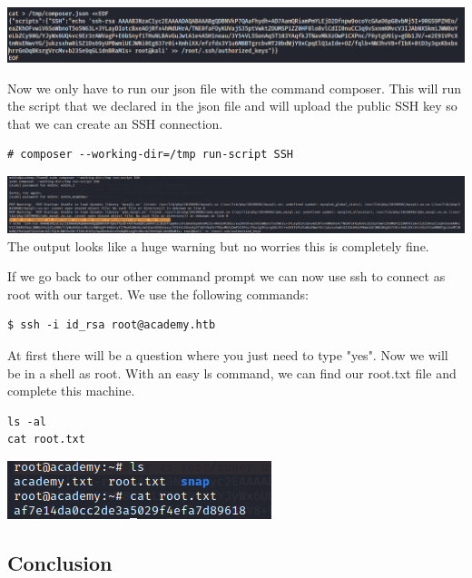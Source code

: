 \documentclass[../main.tex]{subfiles}
\begin{document}
\includegraphics[width=\linewidth]{images/Robbe/Academy_root6.png}

Now we only have to run our json file with the command composer. This will run the script that we declared in the json file and will upload the public SSH key so that we can create an SSH connection.
\begin{lstlisting}
# composer --working-dir=/tmp run-script SSH
\end{lstlisting}
\includegraphics[width=\linewidth]{images/Robbe/Academy_root4.png}
The output looks like a huge warning but no worries this is completely fine. 

If we go back to our other command prompt we can now use ssh to connect as root with our target. We use the following commands:

\begin{lstlisting}
$ ssh -i id_rsa root@academy.htb
\end{lstlisting}

At first there will be a question where you just need to type "yes". Now we will be in a shell as root. With an easy ls command, we can find our root.txt file and complete this machine.

\begin{lstlisting}
ls -al
cat root.txt
\end{lstlisting}

\begin{center}
\includegraphics[width=0.6\linewidth]{images/Robbe/Academy_root5.png}
\end{center}

\pagebreak

\subsection{Conclusion}
\end{document}
